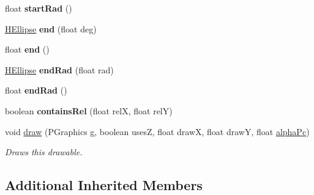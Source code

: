 \begin{DoxyCompactItemize}
\item 
\hypertarget{classhype_1_1extended_1_1drawable_1_1_h_ellipse_af8b4b0f3b999612a79f5a093b15c286e}{float {\bfseries start\-Rad} ()}\label{classhype_1_1extended_1_1drawable_1_1_h_ellipse_af8b4b0f3b999612a79f5a093b15c286e}

\item 
\hypertarget{classhype_1_1extended_1_1drawable_1_1_h_ellipse_a8a5b8ff30e6c85dcbfb563e93074bdfd}{\hyperlink{classhype_1_1extended_1_1drawable_1_1_h_ellipse}{H\-Ellipse} {\bfseries end} (float deg)}\label{classhype_1_1extended_1_1drawable_1_1_h_ellipse_a8a5b8ff30e6c85dcbfb563e93074bdfd}

\item 
\hypertarget{classhype_1_1extended_1_1drawable_1_1_h_ellipse_a091f43be1c14502912457a911c72d132}{float {\bfseries end} ()}\label{classhype_1_1extended_1_1drawable_1_1_h_ellipse_a091f43be1c14502912457a911c72d132}

\item 
\hypertarget{classhype_1_1extended_1_1drawable_1_1_h_ellipse_a0c793a1889a7dd8f74b2288aaf9dc34e}{\hyperlink{classhype_1_1extended_1_1drawable_1_1_h_ellipse}{H\-Ellipse} {\bfseries end\-Rad} (float rad)}\label{classhype_1_1extended_1_1drawable_1_1_h_ellipse_a0c793a1889a7dd8f74b2288aaf9dc34e}

\item 
\hypertarget{classhype_1_1extended_1_1drawable_1_1_h_ellipse_aed99e6cb6f4c3e73f13e47cc7611cd80}{float {\bfseries end\-Rad} ()}\label{classhype_1_1extended_1_1drawable_1_1_h_ellipse_aed99e6cb6f4c3e73f13e47cc7611cd80}

\item 
\hypertarget{classhype_1_1extended_1_1drawable_1_1_h_ellipse_a07ac294be42ea5318fe9a61aef32c274}{boolean {\bfseries contains\-Rel} (float rel\-X, float rel\-Y)}\label{classhype_1_1extended_1_1drawable_1_1_h_ellipse_a07ac294be42ea5318fe9a61aef32c274}

\item 
void \hyperlink{classhype_1_1extended_1_1drawable_1_1_h_ellipse_a3cd6745167cc6678e4625a7a7f226023}{draw} (P\-Graphics g, boolean uses\-Z, float draw\-X, float draw\-Y, float \hyperlink{classhype_1_1core_1_1drawable_1_1_h_drawable_ab71ad420ba6d4a5eb981296684033d74}{alpha\-Pc})
\begin{DoxyCompactList}\small\item\em Draws this drawable. \end{DoxyCompactList}\end{DoxyCompactItemize}
\subsection*{Additional Inherited Members}


